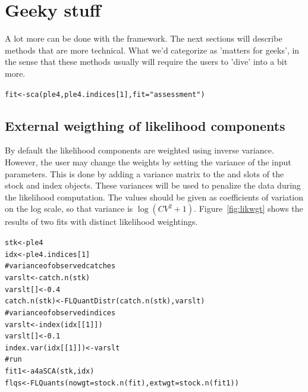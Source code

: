\documentclass[a4paper,english,10pt]{article}\usepackage[]{graphicx}\usepackage[]{color}
\makeatletter
\newcommand{\hlnum}[1]{\textcolor[rgb]{0.063,0.58,0.627}{#1}}%
\newcommand{\hlstr}[1]{\textcolor[rgb]{0.063,0.58,0.627}{#1}}%
\newcommand{\hlcom}[1]{\textcolor[rgb]{0.588,0.588,0.588}{#1}}%
\newcommand{\hlstd}[1]{\textcolor[rgb]{0.196,0.196,0.196}{#1}}%
\newcommand{\hlkwb}[1]{\textcolor[rgb]{0.627,0,0.314}{#1}}%
\newcommand{\hlkwc}[1]{\textcolor[rgb]{0,0.631,0.314}{#1}}%
\newcommand{\hlkwd}[1]{\textcolor[rgb]{0.78,0.227,0.412}{#1}}%
\newenvironment{kframe}{%
 \def\at@end@of@kframe{}%
 \ifinner\ifhmode%
  \def\at@end@of@kframe{\end{minipage}}%
  \begin{minipage}{\columnwidth}%
 \fi\fi%
 \def\FrameCommand##1{\hskip\@totalleftmargin \hskip-\fboxsep
 \colorbox{shadecolor}{##1}\hskip-\fboxsep
     \hskip-\linewidth \hskip-\@totalleftmargin \hskip\columnwidth}%
 \MakeFramed {\advance\hsize-\width
   \@totalleftmargin\z@ \linewidth\hsize
   \@setminipage}}%
 {\par\unskip\endMakeFramed%
 \at@end@of@kframe}
\newenvironment{knitrout}{}{} %
\makeatother
\begin{document}
\section{Geeky stuff}

A lot more can be done with the \aFa framework. The next sections will describe methods that are more technical. What we'd categorize as 'matters for geeks', in the sense that these methods usually will require the users to 'dive' into  a bit more.

\begin{knitrout}
\color{fgcolor}\begin{kframe}
\begin{alltt}
\hlstd{fit} \hlkwb{<-} \hlkwd{sca}\hlstd{(ple4, ple4.indices[}\hlnum{1}\hlstd{],} \hlkwc{fit} \hlstd{=} \hlstr{"assessment"}\hlstd{)}
\end{alltt}
\end{kframe}
\end{knitrout}

\subsection{External weigthing of likelihood components}

By default the likelihood components are weighted using inverse variance. However, the user may change the weights by setting the variance of the input parameters. This is done by adding a variance matrix to the  and  slots of the stock and index objects. These variances will be used to penalize the data during the likelihood computation. The values should be given as coefficients of variation on the log scale, so that variance is $\log{({CV}^2 + 1)}$. Figure~\ref{fig:likwgt} shows the results of two fits with distinct likelihood weightings.

\begin{knitrout}
\color{fgcolor}\begin{kframe}
\begin{alltt}
\hlstd{stk} \hlkwb{<-} \hlstd{ple4}
\hlstd{idx} \hlkwb{<-} \hlstd{ple4.indices[}\hlnum{1}\hlstd{]}
\hlcom{# variance of observed catches}
\hlstd{varslt} \hlkwb{<-} \hlkwd{catch.n}\hlstd{(stk)}
\hlstd{varslt[]} \hlkwb{<-} \hlnum{0.4}
\hlkwd{catch.n}\hlstd{(stk)} \hlkwb{<-} \hlkwd{FLQuantDistr}\hlstd{(}\hlkwd{catch.n}\hlstd{(stk), varslt)}
\hlcom{# variance of observed indices}
\hlstd{varslt} \hlkwb{<-} \hlkwd{index}\hlstd{(idx[[}\hlnum{1}\hlstd{]])}
\hlstd{varslt[]} \hlkwb{<-} \hlnum{0.1}
\hlkwd{index.var}\hlstd{(idx[[}\hlnum{1}\hlstd{]])} \hlkwb{<-} \hlstd{varslt}
\hlcom{# run}
\hlstd{fit1} \hlkwb{<-} \hlkwd{a4aSCA}\hlstd{(stk, idx)}
\hlstd{flqs} \hlkwb{<-} \hlkwd{FLQuants}\hlstd{(}\hlkwc{nowgt} \hlstd{=} \hlkwd{stock.n}\hlstd{(fit),} \hlkwc{extwgt} \hlstd{=} \hlkwd{stock.n}\hlstd{(fit1))}
\end{alltt}
\end{kframe}
\end{knitrout}
\end{document}
